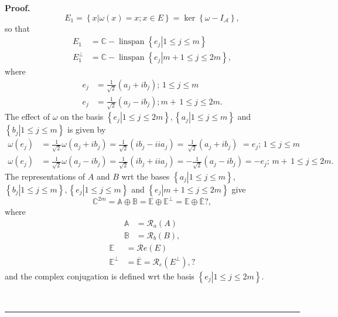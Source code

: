 \documentclass[aps,preprint]{revtex4}%
\newenvironment{proof}[1][Proof]{\noindent\textbf{#1.} }{\ \rule{0.5em}{0.5em}}
\begin{document}
\begin{proof}
\begin{equation}
E_{1}=\left\{  \left.  x\right\vert \omega\left(  x\right)  =x;x\in E\right\}
=\ker\left\{  \omega-I_{\mathcal{A}}\right\}  ,
\end{equation}
so that
\begin{align}
E_{1} &  =\mathbb{C-}\operatorname*{linspan}\left\{  \left.  e_{j}\right\vert
1\leq j\leq m\right\}  \\
E_{1}^{\bot} &  =\mathbb{C-}\operatorname*{linspan}\left\{  \left.
e_{j}\right\vert m+1\leq j\leq2m\right\}  ,
\end{align}
where
\begin{align}
e_{j} &  =\frac{1}{\sqrt{2}}\left(  a_{j}+ib_{j}\right)  ;\,1\leq j\leq m\\
e_{j} &  =\frac{1}{\sqrt{2}}\left(  a_{j}-ib_{j}\right)  ;m+\,1\leq j\leq2m.
\end{align}
The effect of $\omega$ on the basis $\left\{  \left.  e_{j}\right\vert 1\leq
j\leq2m\right\}  ,\left\{  \left.  a_{j}\right\vert 1\leq j\leq m\right\}  $
and $\left\{  \left.  b_{j}\right\vert 1\leq j\leq m\right\}  $ is given by
\begin{align}
\omega\left(  e_{j}\right)   &  =\frac{1}{\sqrt{2}}\omega\left(  a_{j}%
+ib_{j}\right)  =\frac{1}{\sqrt{2}}\left(  ib_{j}-iia_{j}\right)  =\,\frac
{1}{\sqrt{2}}\left(  a_{j}+ib_{j}\right)  \,\,=e_{j};\,1\leq j\leq m\\
\omega\left(  e_{j}\right)   &  =\frac{1}{\sqrt{2}}\omega\left(  a_{j}%
-ib_{j}\right)  =\frac{1}{\sqrt{2}}\left(  ib_{j}+iia_{j}\right)  =-\frac
{1}{\sqrt{2}}\left(  a_{j}-ib_{j}\right)  =-e_{j};\,m+\,1\leq j\leq2m.
\end{align}
The representations of $A$ and $B$ wrt the bases $\left\{  \left.
a_{j}\right\vert 1\leq j\leq m\right\}  $,$\left\{  \left.  b_{j}\right\vert
1\leq j\leq m\right\}  ,\left\{  \left.  e_{j}\right\vert 1\leq j\leq
m\right\}  $ and $\left\{  \left.  e_{j}\right\vert m+1\leq j\leq2m\right\}  $
give
\begin{equation}
\mathbb{C}^{2m}=\mathbb{A\oplus B=E\oplus E}^{\bot}=\mathbb{E\oplus}%
\overline{\mathbb{E}}?,
\end{equation}
where
\begin{align}
\mathbb{A} &  =\mathcal{R}_{a}\left(  A\right)  \\
\mathbb{B} &  =\mathcal{R}_{b}\left(  B\right)  ,
\end{align}%
\begin{align}
\mathbb{E} &  =\mathcal{R}e\left(  E\right)  \\
\mathbb{E}^{\bot} &  =\overline{\mathbb{E}}=\mathcal{R}_{e}\left(  E^{\bot
}\right)  ,?
\end{align}
and the complex conjugation is defined wrt the basis $\left\{  \left.
e_{j}\right\vert 1\leq j\leq2m\right\}  .$


\end{proof}
\end{document}
